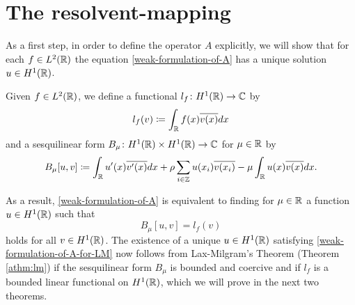 \section{The resolvent-mapping} \label{sec:3.1}

As a first step, in order to define the operator $A$ explicitly, we will show that for each $f \in L^{2}(\mathbb{R})$ the equation \eqref{weak-formulation-of-A} has a unique solution $u \in H^{1}(\mathbb{R})$. 
\begin{definition}
	Given $f \in L^{2}(\mathbb{R})$, we define a functional $l_{f} \colon H^{1}(\mathbb{R}) \rightarrow \mathbb{C}$ by
	\[ l_{f}(v) \coloneqq \int_{\mathbb{R}} f(x) \overline{v(x)} dx \]
and a sesquilinear form $B_{\mu} \colon H^{1}(\mathbb{R}) \times H^{1}(\mathbb{R}) \rightarrow \mathbb{C}$ for $\mu \in \mathbb{R}$ by
	\[ B_{\mu}[u, v] \coloneqq \int_{\mathbb{R}} u'(x) \overline{v'(x)} dx + \rho \sum_{i \in \mathbb{Z}} u(x_{i}) \overline{v(x_{i})} - \mu \int_{\mathbb{R}} u(x) \overline{v(x)} dx. \]
\end{definition}
As a result, \eqref{weak-formulation-of-A} is equivalent to finding for $\mu \in \mathbb{R}$ a function $u \in H^{1}(\mathbb{R})$ such that
	\begin{equation}
		B_{\mu}[u, v] =  l_{f}(v) \label{weak-formulation-of-A-for-LM}
	\end{equation}
holds for all $v \in H^{1}(\mathbb{R})$. The existence of a unique $u \in H^{1}(\mathbb{R})$ satisfying \eqref{weak-formulation-of-A-for-LM} now follows from Lax-Milgram's Theorem (Theorem \ref{athm:lm}) if the sesquilinear form $B_{\mu}$ is bounded and coercive and if $l_{f}$ is a bounded linear functional on $H^{1}(\mathbb{R})$, which we will prove in the next two theorems.
